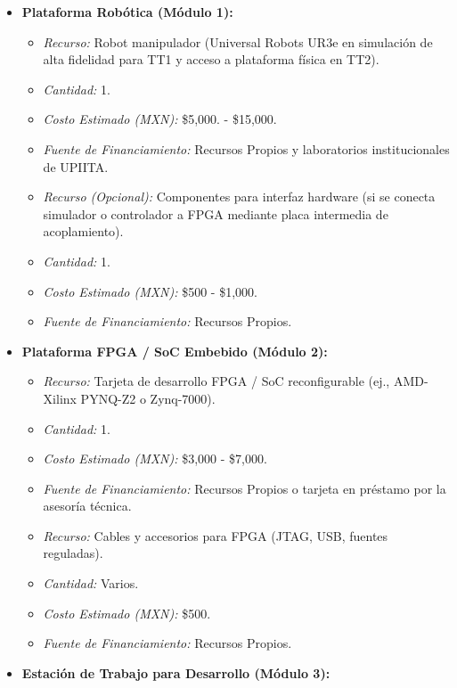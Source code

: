 \documentclass[12pt]{article}
\begin{document}
\begin{itemize}
    \item \textbf{Plataforma Robótica (Módulo 1):}
        \begin{itemize}
            \item \textit{Recurso:} Robot manipulador (Universal Robots UR3e en simulación de alta fidelidad para TT1 y acceso a plataforma física en TT2).
            \item \textit{Cantidad:} 1.
            \item \textit{Costo Estimado (MXN):} \$5,000. - \$15,000.
            \item \textit{Fuente de Financiamiento:} Recursos Propios y laboratorios institucionales de UPIITA.
            \item \textit{Recurso (Opcional):} Componentes para interfaz hardware (si se conecta simulador o controlador a FPGA mediante placa intermedia de acoplamiento).
            \item \textit{Cantidad:} 1.
            \item \textit{Costo Estimado (MXN):} \$500 - \$1,000.
            \item \textit{Fuente de Financiamiento:} Recursos Propios.
        \end{itemize}
    \item \textbf{Plataforma FPGA / SoC Embebido (Módulo 2):}
        \begin{itemize}
            \item \textit{Recurso:} Tarjeta de desarrollo FPGA / SoC reconfigurable (ej., AMD-Xilinx PYNQ-Z2 o Zynq-7000).
            \item \textit{Cantidad:} 1.
            \item \textit{Costo Estimado (MXN):} \$3,000 - \$7,000.
            \item \textit{Fuente de Financiamiento:} Recursos Propios o tarjeta en préstamo por la asesoría técnica.
            \item \textit{Recurso:} Cables y accesorios para FPGA (JTAG, USB, fuentes reguladas).
            \item \textit{Cantidad:} Varios.
            \item \textit{Costo Estimado (MXN):} \$500.
            \item \textit{Fuente de Financiamiento:} Recursos Propios.
        \end{itemize}
    \item \textbf{Estación de Trabajo para Desarrollo (Módulo 3):}
        \begin{itemize}

\end{itemize}
\end{itemize}
\end{document}
